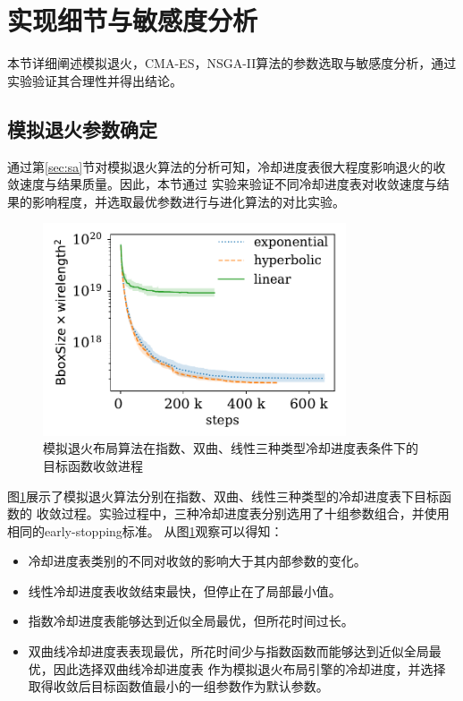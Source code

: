 \section{实现细节与敏感度分析}

本节详细阐述模拟退火，CMA-ES，NSGA-II算法的参数选取与敏感度分析，通过实验验证其合理性并得出结论。

\subsection{模拟退火参数确定}
\label{sec:cooling}

通过第\ref{sec:sa}节对模拟退火算法的分析可知，冷却进度表很大程度影响退火的收敛速度与结果质量。因此，本节通过
实验来验证不同冷却进度表对收敛速度与结果的影响程度，并选取最优参数进行与进化算法的对比实验。

\begin{figure}[h]
	\centering
	\includegraphics[width=0.8\textwidth]{figure/Annealing-Tuning}
	\caption{模拟退火布局算法在指数、双曲、线性三种类型冷却进度表条件下的目标函数收敛进程} 
	\label{fig:annealing-tune}
\end{figure}

图\ref{fig:annealing-tune}展示了模拟退火算法分别在指数、双曲、线性三种类型的冷却进度表下目标函数的
收敛过程。实验过程中，三种冷却进度表分别选用了十组参数组合，并使用相同的early-stopping标准。
从图\ref{fig:annealing-tune}观察可以得知：
\begin{itemize}
    \item 冷却进度表类别的不同对收敛的影响大于其内部参数的变化。
    \item 线性冷却进度表收敛结束最快，但停止在了局部最小值。
    \item 指数冷却进度表能够达到近似全局最优，但所花时间过长。
    \item 双曲线冷却进度表表现最优，所花时间少与指数函数而能够达到近似全局最优，因此选择双曲线冷却进度表
    作为模拟退火布局引擎的冷却进度，并选择取得收敛后目标函数值最小的一组参数作为默认参数。
\end{itemize}


